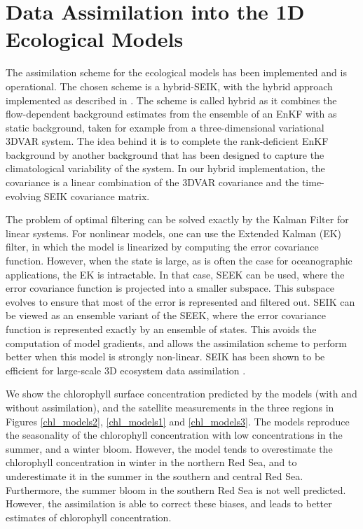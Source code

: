 \section{Data Assimilation into the 1D Ecological Models}

The assimilation scheme for the ecological models has been implemented and is
operational. The chosen scheme is a hybrid-SEIK, with the hybrid approach
implemented as described in \citet{Hamill2000}.  The scheme is called hybrid as
it combines the flow-dependent background estimates from the ensemble of an
EnKF with as static background, taken for example from a three-dimensional
variational 3DVAR system. The idea behind it is to complete the rank-deficient
EnKF background by another background that has been designed to capture the
climatological variability of the system.  In our hybrid implementation, the
covariance is a linear combination of the 3DVAR covariance and the
time-evolving SEIK covariance matrix.

The problem of optimal filtering can be solved exactly by the Kalman Filter for
linear systems. For nonlinear models, one can use the Extended Kalman (EK)
filter, in which the model is linearized by computing the error covariance
function.  However, when the state is large, as is often the case for
oceanographic applications, the EK is intractable. In that case, SEEK can be
used, where the error covariance function is projected into a smaller subspace.
This subspace evolves to ensure that most of the error is represented and
filtered out. SEIK can be viewed as an ensemble variant of the SEEK, where the
error covariance function is represented exactly by an ensemble of states. This
avoids the computation of model gradients, and allows the assimilation scheme
to perform better when this model is strongly non-linear. SEIK has been shown
to be efficient for large-scale 3D ecosystem data assimilation
\citep{Triantafyllou2003}.

We show the chlorophyll surface concentration predicted by the models (with and
without assimilation), and the satellite measurements in the three regions in
Figures \ref{chl_models2}, \ref{chl_models1} and \ref{chl_models3}.  The models
reproduce the seasonality of the chlorophyll concentration with low
concentrations in the summer, and a winter bloom. However, the model tends to
overestimate the chlorophyll concentration in winter in the northern Red Sea,
and to underestimate it in the summer in the southern and central Red Sea.
Furthermore, the summer bloom in the southern Red Sea is not well predicted.
However, the assimilation is able to correct these biases, and leads to better
estimates of chlorophyll concentration.

